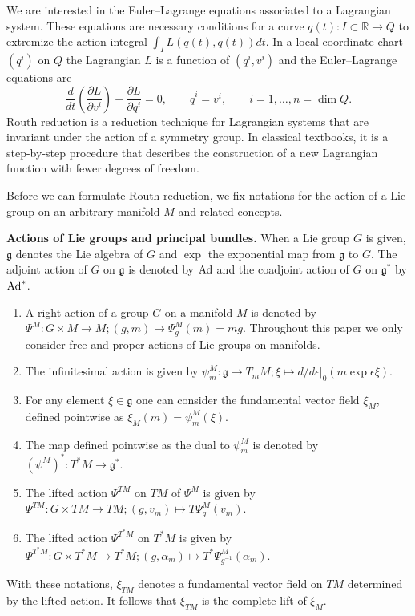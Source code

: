 \documentclass[pdftex]{sigma}
\newcommand{\R}{\mathbb{R}}
\newcommand{\e}{\epsilon}
\newcommand{\lag}{\mathfrak{g}}
\def\fpd#1#2{\frac{\partial #1}{\partial #2}}
\newcommand{\ractie}{\psi}
\begin{document}
We are interested in the Euler--Lagrange equations associated to a Lagrangian system. These equations are necessary conditions for a curve $q(t):I\subset \R \to Q$ to extremize the action integral $\int_I L(q(t), \dot q(t)) dt$. In a local coordinate chart $(q^i)$  on $Q$ the Lagrangian $L$ is a function of $(q^i,v^i)$ and the Euler--Lagrange equations are
\[
\frac{d}{dt} \left(\fpd{L}{v^i} \right) - \fpd{L}{q^i} = 0, \qquad \dot q^i =v^i, \qquad i=1,\ldots, n=\dim Q.
\]
Routh reduction is a reduction technique for Lagrangian systems that are invariant under the action of a symmetry group. In classical textbooks, it is a step-by-step procedure that describes the construction of a new Lagrangian function with fewer degrees of freedom.

Before we can formulate Routh reduction, we f\/ix notations for the action of a Lie group on an arbitrary manifold $M$ and related concepts.

{\bf Actions of Lie groups and principal bundles.}  When a Lie group $G$ is given,  $\lag$ denotes the Lie algebra of $G$ and $\exp$ the exponential map from $\lag$ to $G$. The adjoint action of $G$ on $\lag$ is denoted by ${\rm Ad}$ and the coadjoint action of $G$ on $\lag^*$ by ${\rm Ad}^*$.

\begin{definition} \label{def:acties}\mbox{}
\begin{enumerate}\itemsep=0pt
\item A right action of a group $G$ on a manifold $M$ is denoted by $\Psi^M: G\times M\to M; (g,m)\mapsto \Psi^M_g(m)= mg$. Throughout this paper we only consider free and proper actions of Lie groups on manifolds.
\item  The inf\/initesimal action is given by  $\ractie^M_m:\lag\to T_mM; \xi \mapsto d/d\e|_0 (m\exp \e\xi)$.
\item For any element $\xi \in \lag$ one can consider the fundamental vector f\/ield $\xi_M$, def\/ined pointwise as $\xi_M(m) = \ractie^M_m(\xi)$.
\item The map def\/ined pointwise as the dual to $\ractie^M_m$ is denoted by $(\ractie^M)^*: T^*M \to \lag^*$.
\item The lifted action $\Psi^{TM}$ on $TM$ of $\Psi^M$ is given by $\Psi^{TM}: G\times TM \to TM; (g,v_m) \mapsto T\Psi^M_g(v_m)$.
\item The lifted action $\Psi^{T^*M}$ on $T^*M$ is given by $\Psi^{T^*M}: G\times T^*M \to T^*M; (g,\alpha_m) \mapsto T^*\Psi^M_{g^{-1}}(\alpha_m)$.
\end{enumerate}
\end{definition}
With these notations, $\xi_{TM}$ denotes a fundamental vector f\/ield on $TM$ determined by the lifted action. It follows that $\xi_{TM}$ is the complete lift of $\xi_M$.
\end{document}
